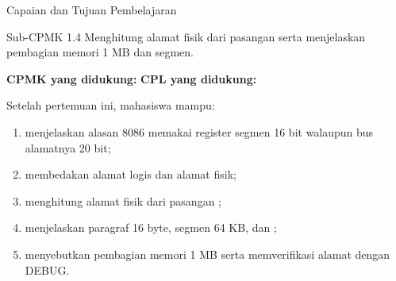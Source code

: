 \documentclass[aspectratio=169,11pt]{beamer}
\begin{document}

\begin{frame}{Capaian dan Tujuan Pembelajaran}
\begin{block}{Sub-CPMK 1.4}
\small Menghitung alamat fisik dari pasangan
 serta menjelaskan pembagian memori 1 MB dan
 segmen.
\end{block}

\vspace{0.1em}
{\small\textbf{CPMK yang didukung:} \quad\textbullet\quad
\textbf{CPL yang didukung:} \par}

\vspace{0.15em}
\begin{exampleblock}{Setelah pertemuan ini, mahasiswa mampu:}
\footnotesize
\begin{enumerate}
    \item menjelaskan alasan 8086 memakai register segmen 16 bit
          walaupun bus alamatnya 20 bit;
    \item membedakan alamat logis dan alamat fisik;
    \item menghitung alamat fisik dari pasangan
          ;
    \item menjelaskan paragraf 16 byte, segmen 64 KB, dan
          ;
    \item menyebutkan pembagian memori 1 MB serta memverifikasi
          alamat dengan DEBUG.
\end{enumerate}
\end{exampleblock}
\end{frame}
\end{document}
